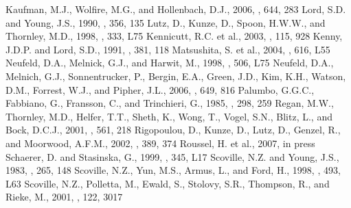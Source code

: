 \documentclass[manuscript]{aastex}
\begin{document}
\begin{thebibliography}{}
 Kaufman, M.J., Wolfire, M.G., and Hollenbach, D.J., 2006, \apj, 644, 283 
 Lord, S.D. and Young, J.S., 1990, \apj, 356, 135
 Lutz, D., Kunze, D., Spoon, H.W.W., and Thornley, M.D., 1998, \aap, 333, L75
 Kennicutt, R.C. et al., 2003, \pasp, 115, 928
 Kenny, J.D.P. and Lord, S.D., 1991, \apj, 381, 118
 Matsushita, S. et al., 2004, \apj, 616, L55
 Neufeld, D.A., Melnick, G.J., and Harwit, M., 1998, \apj, 506, L75
 Neufeld, D.A., Melnich, G.J., Sonnentrucker, P., Bergin, E.A., Green, J.D., Kim, K.H., Watson, D.M., Forrest, W.J., and Pipher, J.L., 2006, \apj, 649, 816 
 Palumbo, G.G.C., Fabbiano, G., Fransson, C., and Trinchieri, G., 1985, \apj, 298, 259
 Regan, M.W., Thornley, M.D., Helfer, T.T., Sheth, K., Wong, T., Vogel, S.N., Blitz, L., and Bock, D.C.J., 2001, \apj, 561, 218
 Rigopoulou, D., Kunze, D., Lutz, D., Genzel, R., and Moorwood, A.F.M., 2002, \aap, 389, 374
 Roussel, H. et al., 2007, in press
 Schaerer, D. and Stasinska, G., 1999, \aap, 345, L17
 Scoville, N.Z. and Young, J.S., 1983, \aj, 265, 148
 Scoville, N.Z., Yun, M.S., Armus, L., and Ford, H., 1998, \apj, 493, L63 
 Scoville, N.Z., Polletta, M., Ewald, S., Stolovy, S.R., Thompson, R., and Rieke, M., 2001, \aj, 122, 3017

\end{thebibliography}
\end{document}
